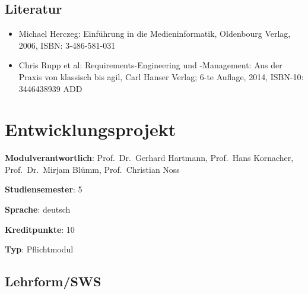 \hypertarget{literaturpathlabelmi-2017modulbeschreibungen-bachelorba_einfhrungindiemedieninformatik}{%
\section*{Literatur\label{/mi-2017/modulbeschreibungen-bachelor/BA_EinfhrungindieMedieninformatik}}\label{literaturpathlabelmi-2017modulbeschreibungen-bachelorba_einfhrungindiemedieninformatik}}

\begin{itemize}
\tightlist
\item
  Michael Herczeg: Einführung in die Medieninformatik, Oldenbourg
  Verlag, 2006, ISBN: 3-486-581-031
\item
  Chris Rupp et al: Requirements-Engineering und -Management: Aus der
  Praxis von klassisch bis agil, Carl Hanser Verlag; 6-te Auflage, 2014,
  ISBN-10: 3446438939 ADD
\end{itemize}

\hypertarget{entwicklungsprojektpathlabelmi-2017modulbeschreibungen-bachelorba_entwicklungsprojekt}{%
\chapter{Entwicklungsprojekt\label{/mi-2017/modulbeschreibungen-bachelor/BA_Entwicklungsprojekt}}\label{entwicklungsprojektpathlabelmi-2017modulbeschreibungen-bachelorba_entwicklungsprojekt}}

\begin{modulHead}
\textbf{Modulverantwortlich}: Prof.~Dr.~Gerhard
Hartmann, Prof.~Hans Kornacher, Prof.~Dr.~Mirjam Blümm, Prof.~Christian
Noss
\end{modulHead}
\begin{modulHead}
\textbf{Studiensemester}:
5
\end{modulHead}
\begin{modulHead}
\textbf{Sprache}:
deutsch
\end{modulHead}
\begin{modulHead}
\textbf{Kreditpunkte}:
10
\end{modulHead}
\begin{modulHead}
\textbf{Typ}:
Pflichtmodul
\end{modulHead}


\hypertarget{lehrformswspathlabelmi-2017modulbeschreibungen-bachelorba_entwicklungsprojekt}{%
\section*{Lehrform/SWS\label{/mi-2017/modulbeschreibungen-bachelor/BA_Entwicklungsprojekt}}\label{lehrformswspathlabelmi-2017modulbeschreibungen-bachelorba_entwicklungsprojekt}}

